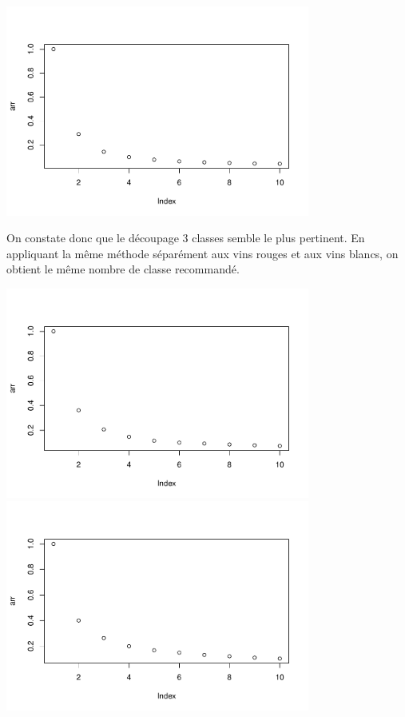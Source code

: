 \documentclass[
]{article}
\begin{document}
\begin{center}
	\includegraphics[width=10cm]{repport_files/figure-latex/unnamed-chunk-5-1.pdf}
\end{center}

On constate donc que le découpage 3 classes semble le plus pertinent. En
appliquant la même méthode séparément aux vins rouges et aux vins
blancs, on obtient le même nombre de classe recommandé.

\begin{center}
	\includegraphics[width=10cm]{repport_files/figure-latex/unnamed-chunk-6-1.pdf}
	\includegraphics[width=10cm]{repport_files/figure-latex/unnamed-chunk-6-2.pdf}
\end{center}
\end{document}
